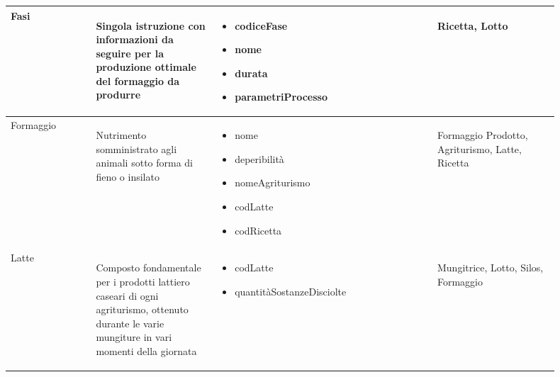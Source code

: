 \documentclass[12pt,a4paper]{article}
\begin{document}
\begin{center}
\begin{longtable}{|p{0.14\linewidth}|p{0.20\linewidth}|p{0.36\linewidth}|p{0.20\linewidth}|}
\hline
Fasi				 	& \begin{flushleft}\vspace{-25pt} Singola istruzione con informazioni da seguire per la produzione ottimale del formaggio da produrre \end{flushleft}
					& \begin{itemize}
						\setlength{\itemindent}{-1em}
						\vspace{-25pt}
						\setlength\itemsep{-0.25em}
						\item codiceFase
						\item nome
						\item durata
						\item parametriProcesso
					\end{itemize}
					& \begin{flushleft}\vspace{-25pt} Ricetta, Lotto \end{flushleft} \\ 

\hline
Formaggio				 	& \begin{flushleft}\vspace{-25pt} Nutrimento somministrato agli animali sotto forma di fieno o insilato \end{flushleft}
					& \begin{itemize}
						\setlength{\itemindent}{-1em}
						\vspace{-25pt}
						\setlength\itemsep{-0.25em}
						\item nome
						\item deperibilità
						\item nomeAgriturismo
						\item codLatte
						\item codRicetta
					\end{itemize}
					& \begin{flushleft}\vspace{-25pt} Formaggio Prodotto, Agriturismo, Latte, Ricetta \end{flushleft} \\ 

\hline
Latte				 	& \begin{flushleft}\vspace{-25pt} Composto fondamentale per i prodotti lattiero caseari di ogni agriturismo, ottenuto durante le varie mungiture in vari momenti della giornata \end{flushleft}
					& \begin{itemize}
						\setlength{\itemindent}{-1em}
						\vspace{-25pt}
						\setlength\itemsep{-0.25em}
						\item codLatte
						\item quantitàSostanzeDi\-sciolte
					\end{itemize}
					& \begin{flushleft}\vspace{-25pt} Mungitrice, Lotto, Silos, Formaggio \end{flushleft} \\ 


\end{longtable}
\end{center}
\end{document}
